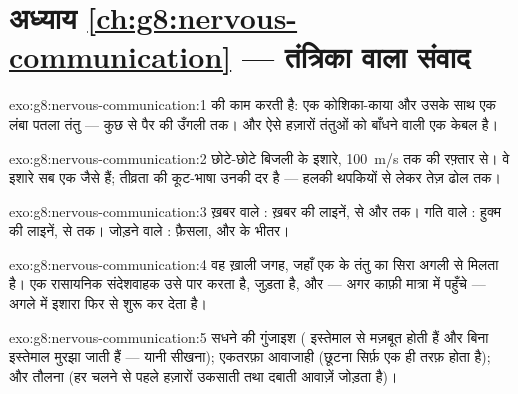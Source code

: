 \section*{अध्याय \ref{ch:g8:nervous-communication} --- तंत्रिका वाला संवाद}

\begin{solution}{exo:g8:nervous-communication:1}
  की काम करती  है: एक कोशिका-काया और उसके साथ
एक लंबा पतला तंतु --- कुछ  से पैर की उँगली तक। और  ऐसे
हज़ारों तंतुओं को बाँधने वाली एक केबल है।
\end{solution}

\begin{solution}{exo:g8:nervous-communication:2}
छोटे-छोटे बिजली के इशारे, \qty{100}{m/s} तक की रफ़्तार से। वे इशारे सब
एक जैसे हैं; तीव्रता की कूट-भाषा उनकी दर है --- हलकी थपकियों से लेकर
तेज़ ढोल तक।
\end{solution}

\begin{solution}{exo:g8:nervous-communication:3}
ख़बर वाले : ख़बर की लाइनें,  से  और 
तक। गति वाले : हुक्म की लाइनें,  से  तक। जोड़ने वाले
: फ़ैसला,  और  के भीतर।
\end{solution}

\begin{solution}{exo:g8:nervous-communication:4}
वह  ख़ाली जगह, जहाँ एक  के तंतु का सिरा अगली  से
मिलता है। एक रासायनिक संदेशवाहक उसे पार करता है, जुड़ता है, और --- अगर
काफ़ी मात्रा में पहुँचे --- अगले  में इशारा फिर से शुरू कर देता
है।
\end{solution}

\begin{solution}{exo:g8:nervous-communication:5}
सधने की गुंजाइश ( इस्तेमाल से मज़बूत होती हैं और बिना
इस्तेमाल मुरझा जाती हैं --- यानी सीखना); एकतरफ़ा आवाजाही (छूटना सिर्फ़
एक ही तरफ़ होता है); और तौलना (हर  चलने से पहले हज़ारों उकसाती
तथा दबाती आवाज़ें जोड़ता है)।
\end{solution}

